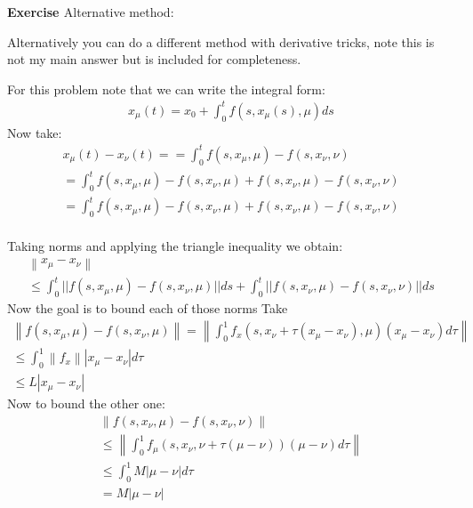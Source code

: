 \documentclass[12pt]{article}
\newenvironment{exercise}[1]{\vspace{.1in}\noindent\textbf{Exercise #1 \hspace{.05em}}}{}
\newcommand{\norm}[1]{\left\lVert#1\right\rVert}
\begin{document}
\begin{exercise}{2.1}
	\textbf{Alternative method}:

	Alternatively you can do a different method with derivative tricks, note this is not my main answer but is included for completeness.

	For this problem note that we can write the integral form:
	\begin{align}
		x_\mu(t) = x_0+\int_0^tf(s,x_\mu(s),\mu)ds
	\end{align}
	Now take:
	\begin{align}
		x_\mu(t)-x_\nu(t)=
		= \int_0^t f(s,x_\mu,\mu)-f(s,x_\nu,\nu)                               \\
		= \int_0^t f(s,x_\mu,\mu)-f(s,x_\nu,\mu)+f(s,x_\nu,\mu)-f(s,x_\nu,\nu) \\
		= \int_0^t f(s,x_\mu,\mu)-f(s,x_\nu,\mu)+f(s,x_\nu,\mu)-f(s,x_\nu,\nu) \\
	\end{align}

	Taking norms and applying the triangle inequality we obtain:
	\begin{align}
		\norm{x_\mu-x_\nu} \\
		\leq \int_0^t ||f(s,x_\mu,\mu)-f(s,x_\nu,\mu)||ds+\int_0^t||f(s,x_\nu,\mu)-f(s,x_\nu,\nu)|| ds
	\end{align}
	Now the goal is to bound each of those norms
	Take
	\begin{align}
		\norm{f(s,x_\mu,\mu)-f(s,x_\nu,\mu)}= \norm{\int_0^1 f_x(s,x_\nu+\tau(x_\mu-x_\nu),\mu)(x_\mu-x_\nu)d\tau} \\
		\leq\int_0^1\norm{f_x}|x_\mu-x_\nu|d\tau                                                                   \\
		\leq L |x_\mu-x_\nu|
	\end{align}
	Now to bound the other one:
	\begin{align}
		\norm{f(s,x_\nu,\mu)-f(s,x_\nu,\nu)}                                 \\
		\leq \norm{\int_0^1 f_\mu(s,x_\nu, \nu+\tau(\mu-\nu))(\mu-\nu)d\tau} \\
		\leq \int_0^1 M|\mu-\nu|d\tau                                        \\
		=M|\mu-\nu|
	\end{align}


\end{exercise}
\end{document}
